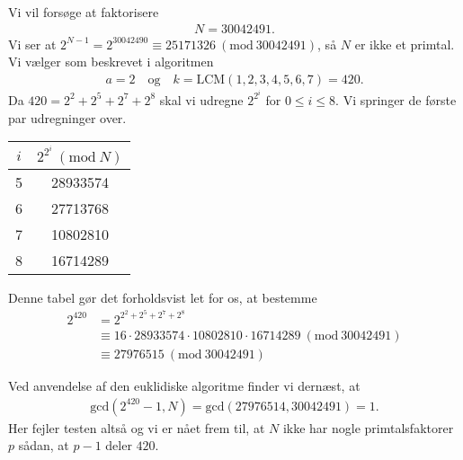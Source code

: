 \begin{example}
Vi vil forsøge at faktorisere 
\begin{align*}
	N = 30042491.
\end{align*}
Vi ser at $2^{N-1} = 2^{30042490} \equiv 25171326 \ (\textrm{mod}\ 30042491)$,
så $N$ er ikke et primtal. Vi vælger som beskrevet i algoritmen
\begin{align*}
	a = 2 \quad \text{og} \quad k = \mathrm{LCM}(1,2,3,4,5,6,7) = 420.
\end{align*}
Da $420 = 2^2 + 2^5 + 2^7 + 2^8$ skal vi udregne $2^{2^i}$ for 
$0 \leq i \leq 8$. Vi springer de første par udregninger over.

\begin{center}
\begin{tabular}{|c|c|}
\hline 
$i$ & $2^{2^i} \ (\mathrm{mod} \ N)$ \\ 
\hline 
5 & 28933574 \\ 
6 & 27713768 \\ 
7 & 10802810 \\ 
8 & 16714289 \\ 
\hline 
\end{tabular} 
\end{center}

Denne tabel gør det forholdsvist let for os, at bestemme
\begin{align*}
	2^{420} &= 2^{2^2 + 2^5 + 2^7 + 2^8} \\
	&\equiv 16 \cdot 28933574 \cdot 10802810 \cdot 16714289 \ 
	(\mathrm{mod} \ 30042491) \\
	&\equiv 27976515 \ (\mathrm{mod} \ 30042491)
\end{align*}

Ved anvendelse af den euklidiske algoritme finder vi dernæst, at
\begin{align*}
	\mathrm{gcd}(2^{420} - 1, N) = \mathrm{gcd}(27976514, 30042491) = 1.
\end{align*}
Her fejler testen altså og vi er nået frem til, at $N$ ikke har nogle 
primtalsfaktorer $p$ sådan, at $p-1$ deler $420$.

\end{example}